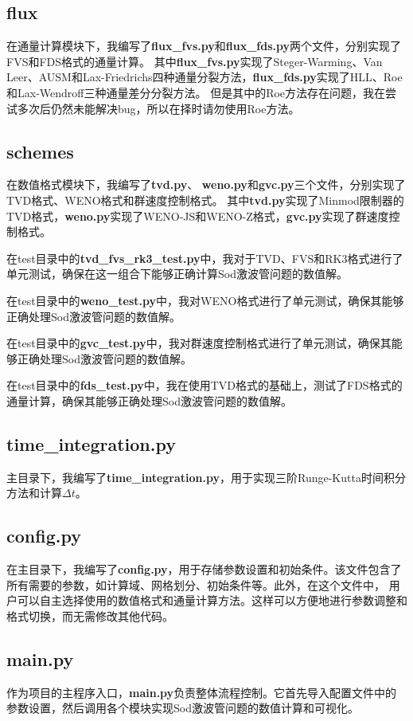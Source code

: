 \documentclass[UTF8]{ctexart}
\begin{document}
\subsection{flux}
在通量计算模块下，我编写了\textbf{flux\_fvs.py}和\textbf{flux\_fds.py}两个文件，分别实现了FVS和FDS格式的通量计算。
其中\textbf{flux\_fvs.py}实现了Steger-Warming、Van Leer、AUSM和Lax-Friedrichs四种通量分裂方法，\textbf{flux\_fds.py}实现了HLL、Roe和Lax-Wendroff三种通量差分分裂方法。
但是其中的Roe方法存在问题，我在尝试多次后仍然未能解决bug，所以在择时请勿使用Roe方法。
\subsection{schemes}
在数值格式模块下，我编写了\textbf{tvd.py}、 \textbf{weno.py}和\textbf{gvc.py}三个文件，分别实现了TVD格式、WENO格式和群速度控制格式。
其中\textbf{tvd.py}实现了Minmod限制器的TVD格式，\textbf{weno.py}实现了WENO-JS和WENO-Z格式，\textbf{gvc.py}实现了群速度控制格式。

在test目录中的\textbf{tvd\_fvs\_rk3\_test.py}中，我对于TVD、FVS和RK3格式进行了单元测试，确保在这一组合下能够正确计算Sod激波管问题的数值解。

在test目录中的\textbf{weno\_test.py}中，我对WENO格式进行了单元测试，确保其能够正确处理Sod激波管问题的数值解。

在test目录中的\textbf{gvc\_test.py}中，我对群速度控制格式进行了单元测试，确保其能够正确处理Sod激波管问题的数值解。

在test目录中的\textbf{fds\_test.py}中，我在使用TVD格式的基础上，测试了FDS格式的通量计算，确保其能够正确处理Sod激波管问题的数值解。
\subsection{time\_integration.py}
主目录下，我编写了\textbf{time\_integration.py}，用于实现三阶Runge-Kutta时间积分方法和计算$\Delta t$。
\subsection{config.py}
在主目录下，我编写了\textbf{config.py}，用于存储参数设置和初始条件。该文件包含了所有需要的参数，如计算域、网格划分、初始条件等。此外，在这个文件中，
用户可以自主选择使用的数值格式和通量计算方法。这样可以方便地进行参数调整和格式切换，而无需修改其他代码。
\subsection{main.py}
作为项目的主程序入口，\textbf{main.py}负责整体流程控制。它首先导入配置文件中的参数设置，然后调用各个模块实现Sod激波管问题的数值计算和可视化。
\end{document}
